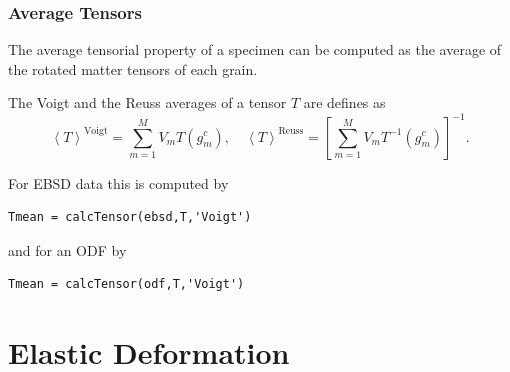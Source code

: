 \documentclass[compress]{beamer}
\begin{document}
\begin{frame}[fragile]
  \frametitle{Average Tensors}

The average tensorial property of a specimen can be computed as the average of
the rotated matter tensors of each grain.

\medskip
\pause

The Voigt and the Reuss averages of a tensor $T$ are defines as
\begin{equation*}
  \left<T\right>^{\text{Voigt}}
  = \sum_{m=1}^{M} V_{m} T(g_{m}^{c}), \quad
  \left<T\right>^{\text{Reuss}}
  = \left[ \sum_{m=1}^{M} V_{m} T^{-1}(g_{m}^{c}) \right]^{-1}.
\end{equation*}

\medskip
\pause

For EBSD data this is computed by
\begin{lstlisting}[style=input]
Tmean = calcTensor(ebsd,T,'Voigt')
\end{lstlisting}

\medskip
\pause

and for an ODF by
\begin{lstlisting}[style=input]
Tmean = calcTensor(odf,T,'Voigt')
\end{lstlisting}

\end{frame}

\section{Elastic Deformation}
\label{sec:elasticity}
\end{document}

